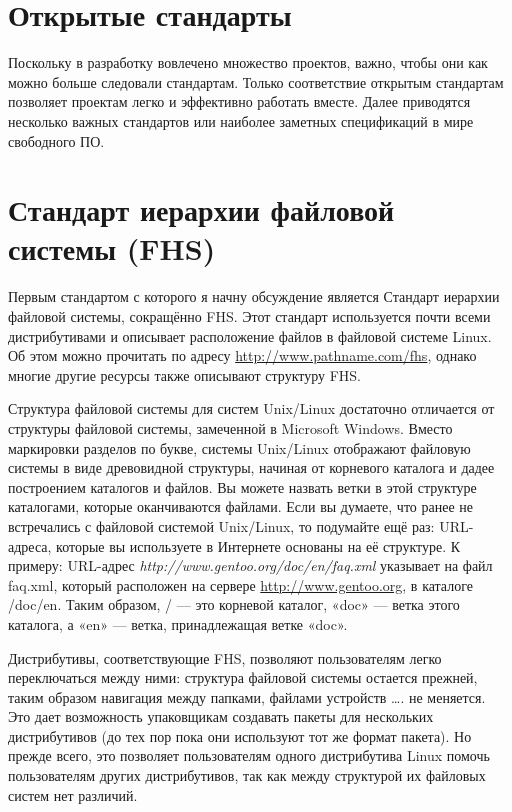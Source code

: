 \documentclass[12pt]{book}
\begin{document}
\section{Открытые стандарты}

Поскольку в разработку вовлечено множество проектов, важно, чтобы они как можно больше следовали стандартам. Только соответствие открытым стандартам позволяет проектам легко и эффективно работать вместе. Далее приводятся несколько важных стандартов или наиболее заметных спецификаций в мире свободного ПО.

\section{Стандарт иерархии файловой системы (FHS)}

Первым стандартом с которого я начну обсуждение является Стандарт иерархии файловой системы, сокращённо FHS. Этот стандарт используется почти всеми дистрибутивами и описывает расположение файлов в файловой системе Linux. Об этом можно прочитать по адресу \href{http://www.pathname.com/fhs/}{http://www.pathname.com/fhs}, однако многие другие ресурсы также описывают структуру FHS.

Структура файловой системы для систем Unix/Linux достаточно отличается от структуры файловой системы, замеченной в Microsoft Windows. Вместо маркировки разделов по букве, системы  Unix/Linux отображают файловую системы в виде древовидной структуры, начиная от корневого каталога и  дадее построением каталогов и файлов. Вы можете назвать ветки в этой структуре каталогами, которые оканчиваются файлами. Если вы думаете, что ранее не встречались с файловой системой Unix/Linux, то подумайте ещё раз: URL-адреса, которые вы используете в Интернете основаны на её структуре. К примеру: URL-адрес \emph{http://www.gentoo.org/\break{}doc/en/faq.xml} указывает на файл faq.xml, который расположен на сервере \href{www.gentoo.org}{http://\break{}www.gentoo.org}, в каталоге /doc/en. Таким образом, / --- это корневой каталог, «doc» --- ветка этого каталога, а «en» --- ветка, принадлежащая ветке «doc».

Дистрибутивы, соответствующие FHS, позволяют пользователям легко переключаться между ними: структура файловой системы остается прежней, таким образом навигация между папками, файлами устройств …. не меняется. Это дает возможность упаковщикам создавать пакеты для нескольких дистрибутивов (до тех пор пока они используют тот же формат пакета). Но прежде всего, это позволяет пользователям одного дистрибутива Linux помочь пользователям других дистрибутивов, так как между структурой их файловых систем нет различий.
\end{document}
